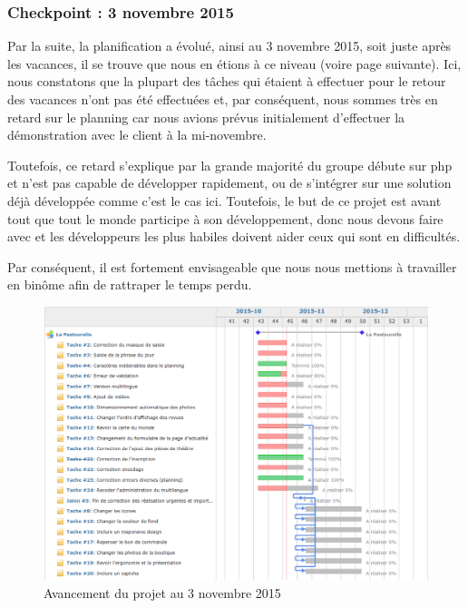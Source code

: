 \documentclass[11pt]{report}
\begin{document}
\subsubsection*{Checkpoint : 3 novembre 2015}
Par la suite, la planification a évolué, ainsi au 3 novembre 2015, soit juste
après les vacances, il se trouve que nous en étions à ce niveau (voire page
suivante). Ici, nous constatons que la plupart des tâches qui étaient à
effectuer pour le retour des vacances n'ont pas été effectuées et, par
conséquent, nous sommes très en retard sur le planning car nous avions prévus
initialement d'effectuer la démonstration avec le client à la mi-novembre.
\par Toutefois, ce retard s'explique par la grande majorité du groupe débute sur
php et n'est pas capable de développer rapidement, ou de s'intégrer sur une
solution déjà développée comme c'est le cas ici. Toutefois, le but de ce projet
est avant tout que tout le monde participe à son développement, donc nous devons
faire avec et les développeurs les plus habiles doivent aider ceux qui sont en
difficultés. 
\par Par conséquent, il est fortement envisageable que nous nous mettions à
travailler en binôme afin de rattraper le temps perdu.

\begin{landscape}
\begin{figure}[t]
    \caption{Avancement du projet au 3 novembre 2015}
   \includegraphics[scale=0.5]{include/gantt3-11.png}
\end{figure}
\end{landscape}
\end{document}
